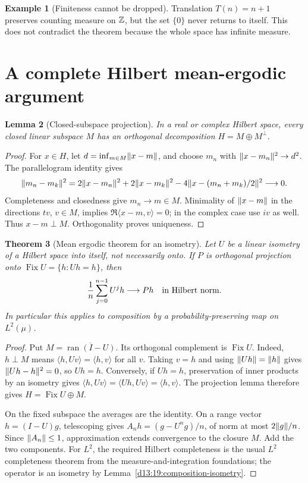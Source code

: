 \documentclass[11pt,oneside]{book}
\newtheorem{theorem}{Theorem}[chapter]
\newtheorem{lemma}[theorem]{Lemma}
\theoremstyle{definition}
\newtheorem{example}[theorem]{Example}
\theoremstyle{remark}\newtheorem{remark}[theorem]{Remark}
\newcommand{\ip}[2]{\langle#1,#2\rangle}
\begin{document}
\begin{example}[Finiteness cannot be dropped]
Translation \(T(n)=n+1\) preserves counting measure on \(\mathbb Z\), but
the set \(\{0\}\) never returns to itself. This does not contradict
the theorem because the whole space has infinite measure.
\end{example}

\section{A complete Hilbert mean-ergodic argument}

\begin{lemma}[Closed-subspace projection]\label{d13:19:hilbert-projection}
In a real or complex Hilbert space, every closed linear subspace
\(M\) has an orthogonal decomposition \(H=M\oplus M^\perp\).
\end{lemma}
\begin{proof}
For \(x\in H\), let \(d=\inf_{m\in M}\lVert x-m\rVert\), and choose \(m_n\)
with \(\lVert x-m_n\rVert^2\to d^2\). The parallelogram identity gives
\[
 \lVert m_n-m_k\rVert^2
 =2\lVert x-m_n\rVert^2+2\lVert x-m_k\rVert^2
       -4\lVert x-(m_n+m_k)/2\rVert^2\longrightarrow0.
\]
Completeness and closedness give \(m_n\to m\in M\).
Minimality of \(\lVert x-m\rVert\) in the directions \(tv\), \(v\in M\),
implies \(\Re\ip{x-m}{v}=0\); in the complex case use \(iv\) as well.
Thus \(x-m\perp M\). Orthogonality proves uniqueness.
\end{proof}

\begin{theorem}[Mean ergodic theorem for an isometry]\label{d13:19:mean-ergodic}
Let \(U\) be a linear isometry of a Hilbert space into itself, not
necessarily onto. If \(P\) is orthogonal projection onto
\(\operatorname{Fix}U=\{h:Uh=h\}\), then
\[
 \frac1n\sum_{j=0}^{n-1}U^jh\longrightarrow Ph
       \quad\hbox{in Hilbert norm}.
\]
In particular this applies to composition by a probability-preserving
map on \(L^2(\mu)\).
\end{theorem}
\begin{proof}
Put \(M=\overline{\operatorname{ran}(I-U)}\).
Its orthogonal complement is \(\operatorname{Fix}U\).
Indeed, \(h\perp M\) means
\(\ip{h}{Uv}=\ip{h}{v}\) for all \(v\). Taking \(v=h\) and using
\(\lVert Uh\rVert=\lVert h\rVert\) gives
\(\lVert Uh-h\rVert^2=0\), so \(Uh=h\).
Conversely, if \(Uh=h\), preservation of inner products by an
isometry gives
\(\ip{h}{Uv}=\ip{Uh}{Uv}=\ip{h}{v}\).
The projection lemma therefore gives
\(H=\operatorname{Fix}U\oplus M\).

On the fixed subspace the averages are the identity. On a range
vector \(h=(I-U)g\), telescoping gives
\(A_nh=(g-U^ng)/n\), of norm at most \(2\lVert g\rVert/n\).
Since \(\lVert A_n\rVert\leq1\), approximation extends convergence to
the closure \(M\). Add the two components. For \(L^2\), the required
Hilbert completeness is the usual \(L^2\) completeness theorem
from the measure-and-integration foundations; the operator is
an isometry by Lemma~\ref{d13:19:composition-isometry}.
\end{proof}
\end{document}
